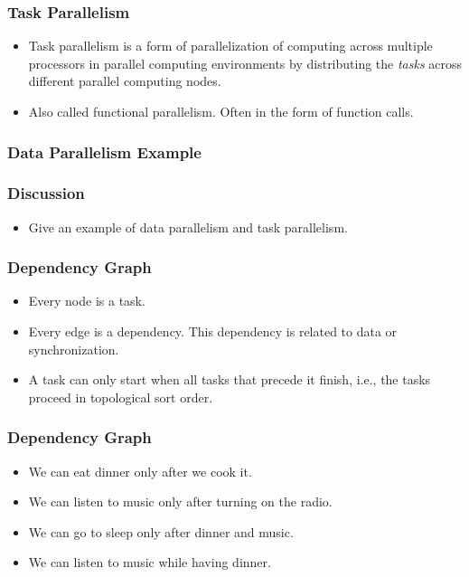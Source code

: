 \documentclass{beamer}
\begin{document}
\begin{CJK}{UTF8}{bsmi}
  \begin{frame}
    \frametitle{Task Parallelism} 
    \begin{itemize}
    \item Task parallelism is a form of parallelization of computing
      across multiple processors in parallel computing environments by
      distributing the {\em tasks} across different parallel computing
      nodes.
    \item Also called functional parallelism.  Often in the form of
      function calls.
    \end{itemize}
  \end{frame}

  \begin{frame}
    \frametitle{Data Parallelism Example}
  \end{frame}


  \begin{frame}
    \frametitle{Discussion} 
    \begin{itemize}
    \item Give an example of data parallelism and task parallelism.
    \end{itemize}
  \end{frame}


  \begin{frame}
    \frametitle{Dependency Graph}
    \begin{itemize}
    \item Every node is a task.
    \item Every edge is a dependency. This dependency is related to data or synchronization.
    \item A task can only start when all tasks that precede it finish, i.e., the tasks proceed in topological sort order.
    \end{itemize}
  \end{frame}

  \begin{frame}
    \frametitle{Dependency Graph}
    \begin{itemize}
    \item We can eat dinner only after we cook it. 
    \item We can listen to music only after turning on the radio.
    \item We can go to sleep only after dinner and music.
    \item We can listen to music while having dinner.
    \end{itemize}
  \end{frame}


\end{CJK}
\end{document}
